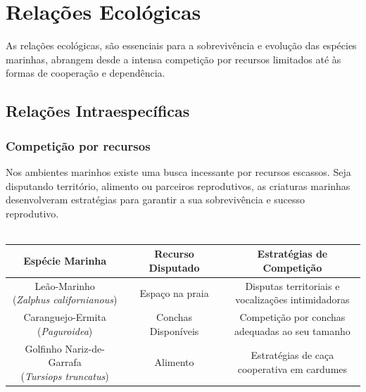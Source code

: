 \documentclass{report}
\begin{document}
\section{Relações Ecológicas}
As relações ecológicas, são essenciais para a sobrevivência e evolução das espécies marinhas, abrangem desde a intensa competição por recursos limitados até às formas de cooperação e dependência.
\subsection{Relações Intraespecíficas}
\subsubsection{Competição por recursos}
Nos ambientes marinhos existe uma busca incessante por recursos escassos. Seja disputando território, alimento ou parceiros reprodutivos, as criaturas marinhas  desenvolveram estratégias para garantir a sua sobrevivência e sucesso reprodutivo.
\\
\\
\begin{tabular}{|c|c|c|} \hline
     Espécie Marinha & Recurso Disputado  & Estratégias de Competição  \\ \hline
    \makecell{Leão-Marinho \\(\textit{Zalphus californianous})} & Espaço na praia & \makecell{Disputas territoriais e \\vocalizações intimidadoras} \\ \hline
    \makecell{Caranguejo-Ermita \\(\textit{Paguroidea})} & \makecell{Conchas \\Disponíveis} & \makecell{Competição por conchas\\ adequadas ao seu tamanho} \\ \hline
    \makecell{Golfinho Nariz-de-Garrafa \\(\textit{Tursiops truncatus})} & Alimento & \makecell{Estratégias de caça \\cooperativa em cardumes} \\ \hline
\end{tabular}
\\
\\
\end{document}
